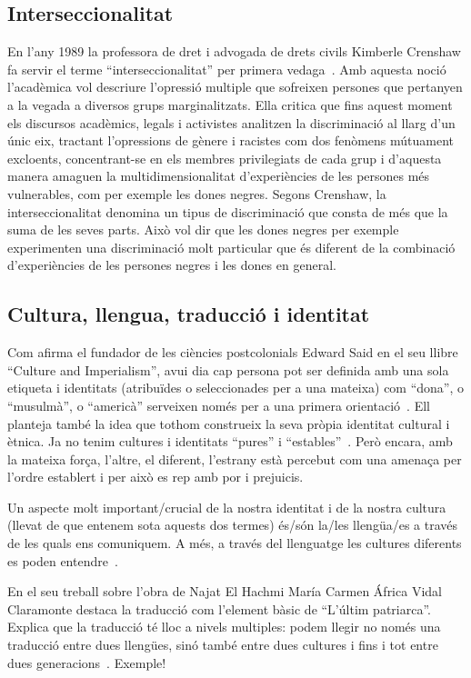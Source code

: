\subsection{Interseccionalitat}
En l'any 1989 la professora de dret i advogada de drets civils Kimberle Crenshaw fa servir el terme ``interseccionalitat'' per primera vedaga~\autocite{Crenshaw1989}.
Amb aquesta noció l'acadèmica vol descriure l'opressió multiple que sofreixen persones que pertanyen a la vegada a diversos grups marginalitzats.
Ella critica que fins aquest moment els discursos acadèmics, legals i activistes analitzen la discriminació al llarg d'un únic eix,
tractant l'opressions de gènere i racistes com dos fenòmens mútuament excloents,
concentrant-se en els membres privilegiats de cada grup i d'aquesta manera amaguen la multidimensionalitat d'experiències de les persones més vulnerables, com per exemple les dones negres.
Segons Crenshaw, la interseccionalitat denomina un tipus de discriminació que consta de més que la suma de les seves parts.
Això vol dir que les dones negres per exemple experimenten una discriminació molt particular que és diferent de la combinació d'experiències de les persones negres i les dones en general.

\subsection{Cultura, llengua, traducció i identitat}
Com afirma el fundador de les ciències postcolonials Edward Said en el seu llibre ``Culture and Imperialism'', avui dia cap persona pot ser definida amb una sola etiqueta
i identitats (atribuïdes o seleccionades per a una mateixa) com ``dona'', o ``musulmà'', o ``americà'' serveixen només per a una primera orientació~\autocite{Vidal2012}.
Ell planteja també la idea que tothom construeix la seva pròpia identitat cultural i ètnica.
Ja no tenim cultures i identitats ``pures'' i ``estables''~\autocite{Vidal2012}.
Però encara, amb la mateixa força, l'altre, el diferent, l'estrany està percebut com una amenaça per l'ordre establert i per això es rep amb por i prejuicis.


Un aspecte molt important/crucial de la nostra identitat i de la nostra cultura (llevat de que entenem sota aquests dos termes) és/són la/les llengüa/es a través de les quals ens comuniquem.
A més, a través del llenguatge les cultures diferents es poden entendre~\autocite{Vidal2012}.


En el seu treball sobre l'obra de Najat El Hachmi María Carmen África Vidal Claramonte destaca la traducció com l'element bàsic de ``L'últim patriarca''.
Explica que la traducció té lloc a nivels multiples: podem llegir no només una traducció entre dues llengües, sinó també entre dues cultures i fins i tot entre dues generacions~\autocite{Vidal2012}.
Exemple!

